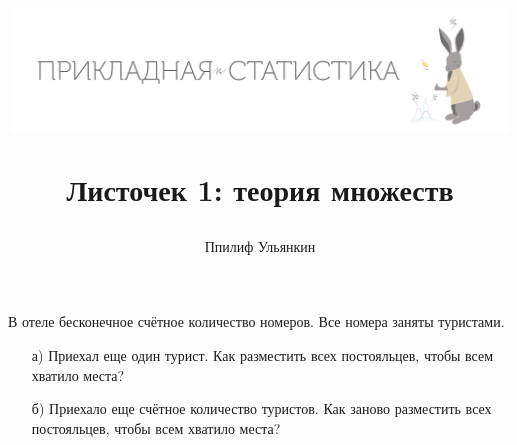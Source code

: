 \documentclass[12pt, a4paper, oneside]{article}
\title{
\begin{center} 
\includegraphics[width=0.99\textwidth]{images/logo.png}
\end{center}

Листочек 1: теория множеств}
\date{}
\author{Ппилиф Ульянкин}
\begin{document}
	
\maketitle

\vspace{-3cm}
\epigraph{}{}

\vspace{-2cm}

\begin{problem}{}
В отеле бесконечное счётное количество номеров. Все номера заняты туристами.
    \begin{enumerate}
    \item[а)] Приехал еще один турист. Как разместить всех постояльцев, чтобы всем хватило места?
    \item[б)] Приехало еще счётное количество туристов. Как заново разместить всех постояльцев, чтобы всем хватило места?
    \end{enumerate}
\end{problem}







\end{document}
